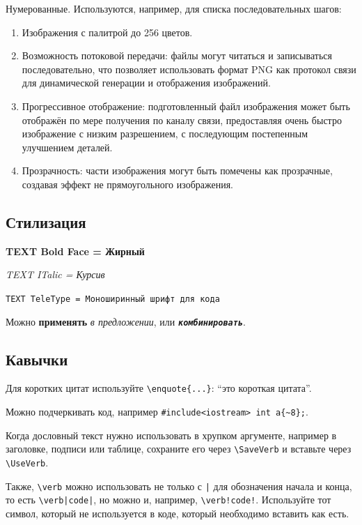 \documentclass[a4paper,12pt]{report}
\begin{document}
Нумерованные. Используются, например, для списка последовательных шагов:

\begin{enumerate}
    \item 
        Изображения с палитрой до 256 цветов.
    \item 
        Возможность потоковой передачи:
        файлы могут читаться и записываться последовательно, что позволяет использовать формат
        PNG как протокол связи для динамической генерации и отображения изображений.
    \item 
        Прогрессивное отображение: подготовленный файл изображения может быть
        отображён по мере получения по каналу связи,
        предоставляя очень быстро изображение с низким разрешением,
        с последующим постепенным улучшением деталей.
    \item 
        Прозрачность: части изображения могут быть помечены как прозрачные,
        создавая эффект не прямоугольного изображения.
\end{enumerate}

\subsection{Стилизация}

\textbf{TEXT Bold Face = Жирный}

\textit{TEXT ITalic = Курсив}

\texttt{TEXT TeleType = Моноширинный шрифт для кода}

Можно \textbf{применять} \textit{в предложении}, или \texttt{\textit{\textbf{комбинировать}}}.

\subsection{Кавычки}

Для коротких цитат используйте \verb|\enquote{...}|:
\enquote{это короткая цитата}.

Можно подчеркивать код, например \verb|#include<iostream> int a{~8};|.

Когда дословный текст нужно использовать в хрупком аргументе, например в заголовке,
подписи или таблице, сохраните его через \verb|\SaveVerb| и вставьте через \verb|\UseVerb|.

Также, \verb|\verb| можно использовать не только с \verb!|! для обозначения начала и конца, то есть \verb!\verb|code|!, но можно и, например, \verb|\verb!code!|. 
Используйте тот символ, который не используется в коде, который необходимо вставить как есть.
\end{document}
